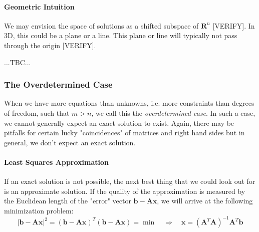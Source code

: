 \paragraph{Geometric Intuition}
We may envision the space of solutions as a shifted subspace of $\mathbf{R}^n$ [VERIFY]. In 3D, this could be a plane or a line. This plane or line will typically not pass through the origin [VERIFY].

 ...TBC...





\subsubsection{The Overdetermined Case}
When we have more equations than unknowns, i.e. more constraints than degrees of freedom, such that $m > n$, we call this the \emph{overdetermined case}. In such a case, we cannot generally expect an exact solution to exist. Again, there may be pitfalls for certain lucky "coincidences" of matrices and right hand sides but in general, we don't expect an exact solution.



\paragraph{Least Squares Approximation}
If an exact solution is not possible, the next best thing that we could look out for is an approximate solution. If the quality of the approximation is measured by the Euclidean length of the "error" vector $\mathbf{b} - \mathbf{A x}$, we will arrive at the following minimization problem:
\begin{equation}
|\mathbf{b} - \mathbf{A x}|^2 = (\mathbf{b} - \mathbf{A x})^T (\mathbf{b} - \mathbf{A x}) = \min
\quad \Rightarrow \quad
\boxed{ \mathbf{x} = (\mathbf{A}^T \mathbf{A})^{-1} \mathbf{A}^T \mathbf{b} }
\end{equation}

